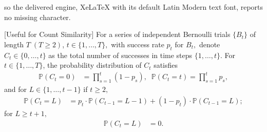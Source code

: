 \documentclass[10pt,a4paper]{amsart}
\begin{document}
so the delivered engine, XeLaTeX with its default Latin Modern text font, reports no missing character.
\begin{theorem}
\label{thm:count_successes_distribution}
[Useful for Count Similarity] For a 
series of independent Bernoulli trials $\{B_t\}$ of length $T\;(T\geq 2)$, $t\in \{1, \dots, T\},$ with success rate $p_t$ for $B_t,$ denote $C_t \in \{0, \dots, t\}$ as the total number of successes in time steps $\{ 1, \dots, t\}$. 
For $t\in\{1, \dots, T\}$, the probability distribution of $C_t$ satisfies
\begin{align}
\mathbb{P}(C_t=0) &=\prod_{s=1}^t(1-p_s), \;\;
 \mathbb{P}(C_t=t) =\prod_{s=1}^t p_s,
 \end{align}
 and for $L\in\{1, \dots, t-1\}$ if $t\geq 2,$
 \begin{align}
 \mathbb{P}(C_t=L) &=p_t\cdot\mathbb{P}(C_{t-1}=L-1) + (1-p_t)\cdot \mathbb{P}(C_{t-1}=L);
    \end{align}
    for $ L\geq t+1,$
    \begin{align}
    \mathbb{P}(C_t=L)&=0.
\end{align}
\end{theorem}
\end{document}
